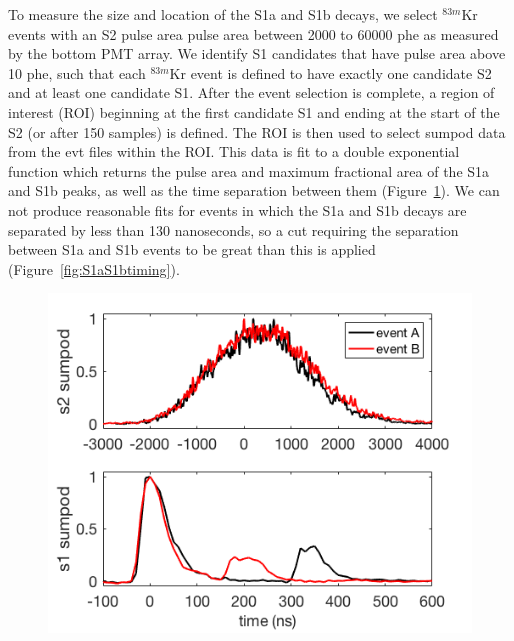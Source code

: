 To measure the size and location of the S1a and S1b decays, we select $^{83m}$Kr events with an S2 pulse area pulse area between 2000 to 60000 phe as measured by the bottom PMT array.  We identify S1 candidates that have pulse area above 10 phe, such that each $^{83m}$Kr event is defined to have exactly one candidate S2 and at least one candidate S1.  After the event selection is complete, a region of interest (ROI) beginning at the first candidate S1 and ending at the start of the S2 (or after 150 samples) is defined. The ROI is then used to select sumpod data from the evt files within the ROI.  This data is  fit to a double exponential function which returns the pulse area and maximum fractional area of the S1a and S1b peaks, as well as the time separation between them (Figure~\ref{fig:Sumpod}). We can not produce reasonable fits for events in which the S1a and S1b decays are separated by less than 130 nanoseconds, so a cut requiring the separation between S1a and S1b events to be great than this is applied  (Figure~\ref{fig:S1aS1btiming}).

\begin{figure}
\includegraphics[scale=0.4]{figures/S1abS2_sumpod_040317_2.png}
 \label{fig:Sumpod}
\end{figure}

